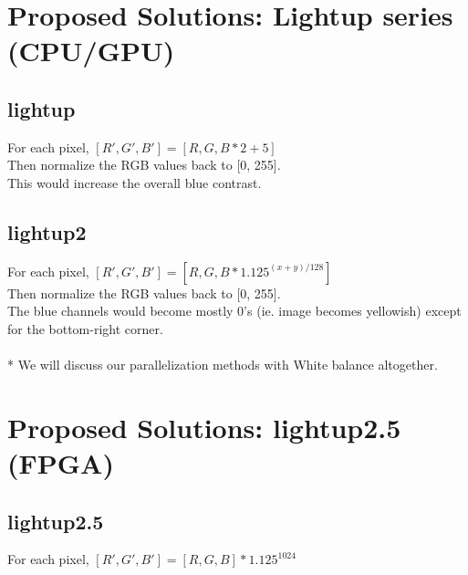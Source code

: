 \documentclass{acm_proc_article-sp}
\begin{document}
\section{Proposed Solutions: Lightup series (CPU/GPU)}
\subsection{lightup}
For each pixel, \([R', G', B'] = [R, G, B * 2 + 5] \) \\
Then normalize the RGB values back to [0, 255]. \\
This would increase the overall blue contrast.
\subsection{lightup2}
For each pixel, \([R', G', B'] = [R, G, B * 1.125^{(x + y) / 128}]\) \\
Then normalize the RGB values back to [0, 255]. \\
The blue channels would become mostly 0's (ie. image becomes yellowish) except for the bottom-right corner. \\
\\
* We will discuss our parallelization methods with White balance altogether.

\section{Proposed Solutions: lightup2.5 (FPGA)}
\subsection{lightup2.5}
For each pixel, \([R', G', B'] = [R, G, B] * 1.125^{1024}\)
\end{document}
